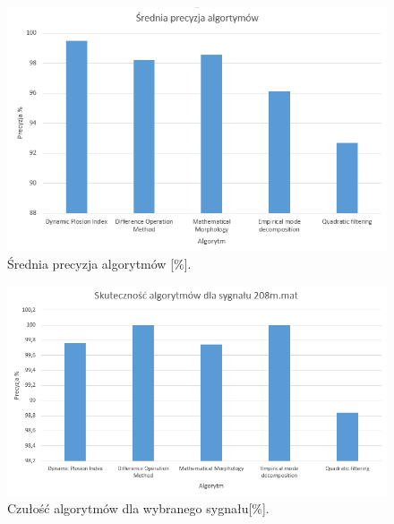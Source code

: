 \documentclass[10pt,a4paper]{article}
\begin{document}
\medskip
\begin{figure}[h!]
\centering
\includegraphics[width=\textwidth]{precis1}
\caption{Średnia precyzja algorytmów [\%]. }
\label{precis1}
\end{figure} 
\FloatBarrier
\medskip

\medskip
\begin{figure}[h!]
\centering
\includegraphics[width=\textwidth]{precis2}
\caption{Czułość algorytmów dla wybranego sygnału[\%]. }
\label{precis2}
\end{figure} 
\FloatBarrier
\medskip
\end{document}
